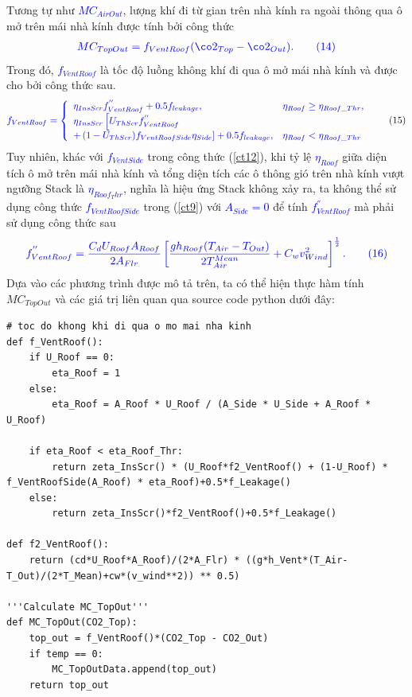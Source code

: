 \documentclass[13pt,a4paper]{article}
\begin{document}
			Tương tự như \textcolor{blue}{$MC_{AirOut}$}, lượng khí  đi từ gian trên nhà kính ra ngoài thông qua ô mở trên mái nhà kính được tính bởi công thức
			\begin{align}
				\color{blue}
					MC_{TopOut} = f_{VentRoof}(\co2_{Top} - \co2_{Out}).
				\color{blue}
				\tag{14} \label{ct14}
			\end{align}
			Trong đó, \textcolor{blue}{$f_{VentRoof}$} là tốc độ luồng không khí đi qua ô mở mái nhà kính và được cho bởi công thức sau.
			\begin{align}
				\textcolor{blue}{f_{VentRoof} = \left\{\begin{array}{lll}
						\eta_{InsScr}f^{''}_{VentRoof} + 0.5f_{leakage}, & \eta_{Roof} \geq \eta_{Roof\_Thr}, \\
						\eta_{InsScr}\left[U_{ThScr}f^{''}_{VentRoof}\right.  \\
						+ \left(1 - U_{ThScr})f_{VentRoofSide}\eta_{Side}\right] + 0.5f_{leakage}, & \eta_{Roof} < \eta_{Roof\_Thr}
					\end{array}\right.}
				\tag{15} \label{ct15}
			\end{align}
			Tuy nhiên, khác với \textcolor{blue}{$f_{VentSide}$} trong công thức (\ref{ct12}), khi tỷ lệ \textcolor{blue}{$\eta_{Roof}$} giữa diện tích ô mở trên mái nhà kính và tổng diện tích các ô thông gió trên nhà kính vượt ngưỡng Stack là \textcolor{blue}{$\eta_{Roof_Thr}$}, nghĩa
			là hiệu ứng Stack không xảy ra, ta không thể sử dụng công thức \textcolor{blue}{$f_{VentRoofSide}$} trong (\ref{ct9}) với \textcolor{blue}{$A_{Side} = 0$} để tính \textcolor{blue}{$f^{''}_{VentRoof}$} mà phải sử dụng công thức sau 
			\begin{align}
				\color{blue}
				f^{''}_{VentRoof} = \frac{C_dU_{Roof}A_{Roof}}{2A_{Flr}}\left[\frac{gh_{Roof}(T_{Air} - T_{Out})}{2T^{Mean}_{Air}} + C_wv^2_{Wind}\right]^{\frac{1}{2}}.
				\color{blue}
				\tag{16} \label{ct16}
			\end{align}
			Dựa vào các phương trình được mô tả trên, ta có thể hiện thực hàm tính $MC_{TopOut}$ và các giá trị liên quan qua source code python dưới đây:
\begin{lstlisting}
# toc do khong khi di qua o mo mai nha kinh
def f_VentRoof():
	if U_Roof == 0:
		eta_Roof = 1
	else:
		eta_Roof = A_Roof * U_Roof / (A_Side * U_Side + A_Roof * U_Roof)
		
	if eta_Roof < eta_Roof_Thr:
		return zeta_InsScr() * (U_Roof*f2_VentRoof() + (1-U_Roof) * f_VentRoofSide(A_Roof) * eta_Roof)+0.5*f_Leakage()
	else:
		return zeta_InsScr()*f2_VentRoof()+0.5*f_Leakage()

def f2_VentRoof():
	return (cd*U_Roof*A_Roof)/(2*A_Flr) * ((g*h_Vent*(T_Air-T_Out)/(2*T_Mean)+cw*(v_wind**2)) ** 0.5)

'''Calculate MC_TopOut'''
def MC_TopOut(CO2_Top):
	top_out = f_VentRoof()*(CO2_Top - CO2_Out)
	if temp == 0:
		MC_TopOutData.append(top_out)
	return top_out
\end{lstlisting}
\end{document}
